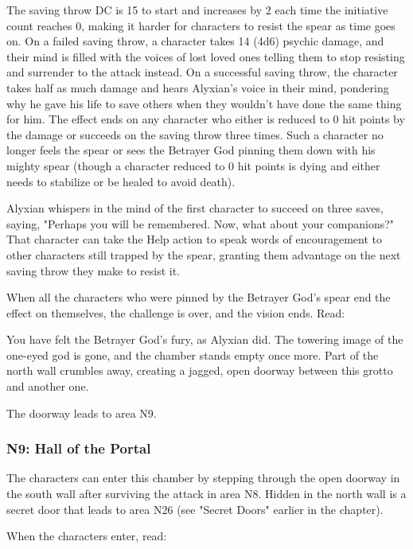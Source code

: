 \documentclass[a4paper, 11pt, bg=full, twocolumn, nooutline]{dndbook}
\begin{document}
The saving throw DC is 15 to start and increases by 2 each time the initiative count reaches 0, making it harder for characters to resist the spear as time goes on. On a failed saving throw, a character takes 14 (4d6) psychic damage, and their mind is filled with the voices of lost loved ones telling them to stop resisting and surrender to the attack instead. On a successful saving throw, the character takes half as much damage and hears Alyxian's voice in their mind, pondering why he gave his life to save others when they wouldn't have done the same thing for him. The effect ends on any character who either is reduced to 0 hit points by the damage or succeeds on the saving throw three times. Such a character no longer feels the spear or sees the Betrayer God pinning them down with his mighty spear (though a character reduced to 0 hit points is dying and either needs to stabilize or be healed to avoid death).

Alyxian whispers in the mind of the first character to succeed on three saves, saying, "Perhaps you will be remembered. Now, what about your companions?" That character can take the Help action to speak words of encouragement to other characters still trapped by the spear, granting them advantage on the next saving throw they make to resist it.

When all the characters who were pinned by the Betrayer God's spear end the effect on themselves, the challenge is over, and the vision ends. Read:

\begin{DndReadAloud}
You have felt the Betrayer God's fury, as Alyxian did. The towering image of the one-eyed god is gone, and the chamber stands empty once more. Part of the north wall crumbles away, creating a jagged, open doorway between this grotto and another one.
\end{DndReadAloud}

The doorway leads to area N9.

\subsubsection{N9: Hall of the Portal}

The characters can enter this chamber by stepping through the open doorway in the south wall after surviving the attack in area N8. Hidden in the north wall is a secret door that leads to area N26 (see "Secret Doors" earlier in the chapter).

When the characters enter, read:
\end{document}
